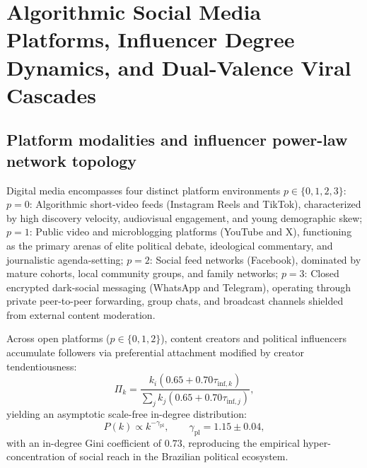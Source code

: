\documentclass[11pt,a4paper]{article}
\begin{document}
\section{Algorithmic Social Media Platforms, Influencer Degree Dynamics, and Dual-Valence Viral Cascades}
\label{snote:algorithmic_social_media}

\subsection{Platform modalities and influencer power-law network topology}
\label{sssec:platforms_power_law}
Digital media encompasses four distinct platform environments $p \in \{0, 1, 2, 3\}$:
$p = 0$: Algorithmic short-video feeds (Instagram Reels and TikTok), characterized by high discovery velocity, audiovisual engagement, and young demographic skew;
$p = 1$: Public video and microblogging platforms (YouTube and X), functioning as the primary arenas of elite political debate, ideological commentary, and journalistic agenda-setting;
$p = 2$: Social feed networks (Facebook), dominated by mature cohorts, local community groups, and family networks;
$p = 3$: Closed encrypted dark-social messaging (WhatsApp and Telegram), operating through private peer-to-peer forwarding, group chats, and broadcast channels shielded from external content moderation.

Across open platforms ($p \in \{0, 1, 2\}$), content creators and political influencers accumulate followers via preferential attachment modified by creator tendentiousness:
\begin{equation}
    \Pi_k = \frac{k_i (0.65 + 0.70\tau_{\mathrm{inf}, k})}{\sum_j k_j (0.65 + 0.70\tau_{\mathrm{inf}, j})},
    \label{eq:preferential_attachment_influencer}
\end{equation}
yielding an asymptotic scale-free in-degree distribution:
\begin{equation}
    P(k) \propto k^{-\gamma_{\mathrm{pl}}}, \qquad \gamma_{\mathrm{pl}} = 1.15 \pm 0.04,
    \label{eq:power_law_distribution}
\end{equation}
with an in-degree Gini coefficient of $0.73$, reproducing the empirical hyper-concentration of social reach in the Brazilian political ecosystem.
\end{document}
